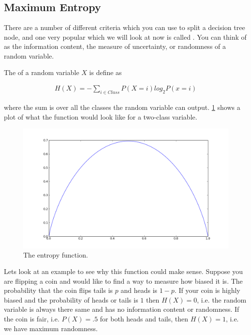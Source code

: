 \subsection{Maximum Entropy}


There are a number of different criteria which you can use to split a decision tree node, and one very popular which we will look at now is called . You can think of  as the information content, the measure of uncertainty, or randomness of a random variable. 

The  of a random variable $X$ is define as 

\begin{align*}
    H(X) = - \sum_{i \in Class} P(X=i)log_{2}P(x=i)
\end{align*}

where the sum is over all the classes the random variable can output. \ref{class:entropy} shows a plot of what the function would look like for a two-class variable. 

\begin{figure}
  \includegraphics[width=\textwidth]{../images/entropy}
  \caption{The entropy function.}
  \label{class:entropy}
\end{figure}




Lets look at an example to see why this function could make sense. Suppose you are flipping a coin and would like to find a way to measure how biased it is. The probability that the coin flips tails is $p$ and heads is $1-p$. If your coin is highly biased and the probability of heads or tails is $1$ then $H(X)=0$, i.e. the random variable is always there same and has no information content or randomness. If the coin is fair, i.e. $P(X)=.5$ for both heads and tails, then $H(X)=1$, i.e. we have maximum randomness. 


